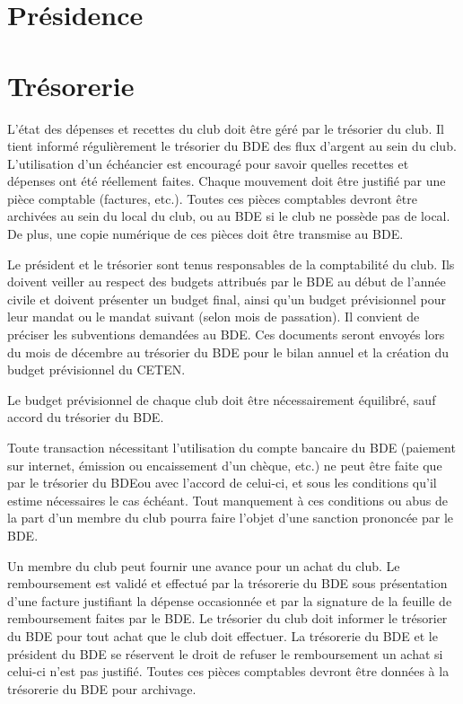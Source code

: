 \documentclass{article}
\begin{document}
\begin{multicols}{2}
{		}

		\section{Présidence}
\label{sec:presidence}

		\section{Trésorerie}
\label{sec:tresorerie}

		{\small
		
			L’état des dépenses et recettes du club doit être géré par le
			trésorier du club. Il tient informé régulièrement le trésorier du
			BDE des flux d’argent au sein du club. L’utilisation d’un échéancier
			est encouragé pour savoir quelles recettes et dépenses ont été
			réellement faites. Chaque mouvement doit être justifié par une pièce
			comptable (factures, etc.). Toutes ces pièces comptables devront
			être archivées au sein du local du club, ou au BDE si le club ne
			possède pas de local. De plus, une copie numérique de ces pièces
			doit être transmise au BDE\@.

			Le président et le trésorier sont tenus responsables de la
			comptabilité du club. Ils doivent veiller au respect des budgets
			attribués par le BDE au début de l’année civile et doivent présenter
			un budget final, ainsi qu’un budget prévisionnel pour leur mandat ou
			le mandat suivant (selon mois de passation). Il convient de préciser
			les subventions demandées au BDE\@. Ces documents seront envoyés
			lors du mois de décembre au trésorier du BDE pour le bilan annuel et
			la création du budget prévisionnel du CETEN\@.

			Le budget prévisionnel de chaque club doit être nécessairement
			équilibré, sauf accord du trésorier du BDE\@.

			Toute transaction nécessitant l’utilisation du compte bancaire du
			BDE (paiement sur internet, émission ou encaissement d’un chèque,
			etc.) ne peut être faite que par le trésorier du BDE\@ ou avec
			l'accord de celui-ci, et sous les conditions qu'il estime
			nécessaires le cas échéant. Tout manquement à ces conditions ou abus
			de la part d'un membre du club pourra faire l'objet d'une sanction
			prononcée par le BDE\@.

			Un membre du club peut fournir une avance pour un achat du club. Le
			remboursement est validé et effectué par la trésorerie du BDE sous
			présentation d’une facture justifiant la dépense occasionnée et par
			la signature de la feuille de remboursement faites par le BDE\@. Le
			trésorier du club doit informer le trésorier du BDE pour tout achat
			que le club doit effectuer. La trésorerie du BDE et le président du
			BDE se réservent le droit de refuser le remboursement un achat si
			celui-ci n’est pas justifié. Toutes ces pièces comptables devront
			être données à la trésorerie du BDE pour archivage.

}
\end{multicols}
\end{document}
